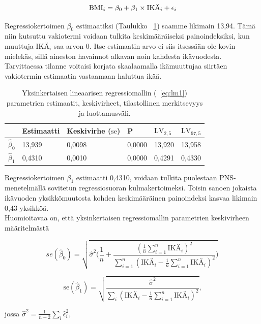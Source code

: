 \documentclass[finnish]{docopts}
\begin{document}
\begin{equation}
\text{BMI}_i = \beta_0 + \beta_1 \times \text{IKÄ}_i + \epsilon_i \label{eq:lm1}\\
\end{equation}


Regressiokertoimen $\beta_0$ estimaatiksi (Taulukko ~\ref{table:lm1}) saamme likimain 13,94. Tämä niin kutsuttu vakiotermi voidaan tulkita keskimääräiseksi painoindeksiksi, kun muuttuja $\text{IKÄ}_i$ saa arvon 0. Itse estimaatin arvo ei siis itsessään ole kovin mielekäs, sillä aineston havainnot alkavan noin kahdesta ikävuodesta. Tarvittaessa tilanne voitaisi korjata skaalaamalla ikämuuttujaa siirtäen vakiotermin estimaatin vastaamaan haluttua ikää.\\

\begin{table}[H]
\centering
\begin{tabular}{llllll}
\toprule
  & Estimaatti & Keskivirhe ($\text{se}$) & P & $\text{LV}_{2,5}$ & $\text{LV}_{97,5}$\\
\midrule
$\hat{\beta}_0$ & 13,939 & 0,0098 & 0,0000 & 13,920 & 13,958\\
$\hat{\beta}_1$ & 0,4310 & 0,0010 & 0,0000 & 0,4291 & 0,4330\\
\bottomrule
\end{tabular}
\caption{Yksinkertaisen lineaarisen regressiomallin (~\ref{eq:lm1}) parametrien estimaatit, keskivirheet, tilastollinen merkitsevyys ja luottamusväli.}
\label{table:lm1}
\end{table}

Regressiokertoimen $\beta_1$ estimaatti 0,4310, voidaan tulkita puolestaan PNS-menetelmällä sovitetun regressiosuoran kulmakertoimeksi. Toisin sanoen jokaista ikävuoden yksikkömuutosta kohden keskimääräinen painoindeksi kasvaa likimain 0,43 yksikköä.\\

Huomioitavaa on, että yksinkertaisen regressiomallin parametrien keskivirheen määritelmästä

$$
se(\hat{\beta}_0)= \sqrt{\hat{\sigma}^2 \Bigg( \frac{1}{n}+\frac{( \frac{1}{n}\sum\limits_{i = 1}^{n}\text{IKÄ}_i)^2}{\sum_{i=1}^n (\text{IKÄ}_i- \frac{1}{n}\sum\limits_{i = 1}^{n}\text{IKÄ}_i)^2} \Bigg)}\,\!
$$

$$
\text{se}(\hat{\beta}_1) = \sqrt{\frac{\hat{\sigma}^2}{\sum_i (\text{IKÄ}_i - \frac{1}{n}\sum\limits_{i = 1}^{n}\text{IKÄ}_i)^2}},
$$

jossa $\hat{\sigma}^2 = \frac{1}{n-2} \sum_i \hat{\epsilon}_i^2$,\\
\end{document}
